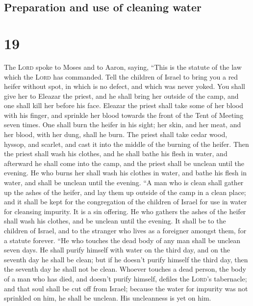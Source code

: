 \hypertarget{preparation-and-use-of-cleaning-water}{%
\subsection{Preparation and use of cleaning
water}\label{preparation-and-use-of-cleaning-water}}

\hypertarget{section-18}{%
\section{19}\label{section-18}}

 The \textsc{Lord} spoke to Moses and to Aaron, saying,
 ``This is the statute of the law which the \textsc{Lord}
has commanded. Tell the children of Israel to bring you a red heifer
without spot, in which is no defect, and which was never yoked.
 You shall give her to Eleazar the priest, and he shall
bring her outside of the camp, and one shall kill her before his face.
 Eleazar the priest shall take some of her blood with his
finger, and sprinkle her blood towards the front of the Tent of Meeting
seven times.  One shall burn the heifer in his sight; her
skin, and her meat, and her blood, with her dung, shall he burn.
 The priest shall take cedar wood, hyssop, and scarlet,
and cast it into the middle of the burning of the heifer. 
Then the priest shall wash his clothes, and he shall bathe his flesh in
water, and afterward he shall come into the camp, and the priest shall
be unclean until the evening.  He who burns her shall wash
his clothes in water, and bathe his flesh in water, and shall be unclean
until the evening.  ``A man who is clean shall gather up
the ashes of the heifer, and lay them up outside of the camp in a clean
place; and it shall be kept for the congregation of the children of
Israel for use in water for cleansing impurity. It is a sin offering.
 He who gathers the ashes of the heifer shall wash his
clothes, and be unclean until the evening. It shall be to the children
of Israel, and to the stranger who lives as a foreigner amongst them,
for a statute forever.  ``He who touches the dead body of
any man shall be unclean seven days.  He shall purify
himself with water on the third day, and on the seventh day he shall be
clean; but if he doesn't purify himself the third day, then the seventh
day he shall not be clean.  Whoever touches a dead
person, the body of a man who has died, and doesn't purify himself,
defiles the \textsc{Lord}'s tabernacle; and that soul shall be cut off
from Israel; because the water for impurity was not sprinkled on him, he
shall be unclean. His uncleanness is yet on him.

